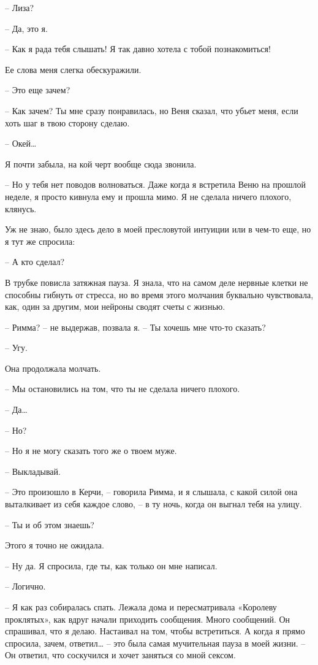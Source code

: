 \documentclass[
]{book}
\begin{document}
-- Лиза?

-- Да, это я.

-- Как я рада тебя слышать! Я так давно хотела с тобой познакомиться!

Ее слова меня слегка обескуражили.

-- Это еще зачем?

-- Как зачем? Ты мне сразу понравилась, но Веня сказал, что убьет меня, если хоть шаг в твою сторону сделаю.

-- Окей\ldots{}

Я почти забыла, на кой черт вообще сюда звонила.

-- Но у тебя нет поводов волноваться. Даже когда я встретила Веню на прошлой неделе, я просто кивнула ему и прошла мимо. Я не сделала ничего плохого, клянусь.

Уж не знаю, было здесь дело в моей пресловутой интуиции или в чем-то еще, но я тут же спросила:

-- А кто сделал?

В трубке повисла затяжная пауза. Я знала, что на самом деле нервные клетки не способны гибнуть от стресса, но во время этого молчания буквально чувствовала, как, один за другим, мои нейроны сводят счеты с жизнью.

-- Римма? -- не выдержав, позвала я. -- Ты хочешь мне что-то сказать?

-- Угу.

Она продолжала молчать.

-- Мы остановились на том, что ты не сделала ничего плохого.

-- Да\ldots{}

-- Но?

-- Но я не могу сказать того же о твоем муже.

-- Выкладывай.

-- Это произошло в Керчи, -- говорила Римма, и я слышала, с какой силой она выталкивает из себя каждое слово, -- в ту ночь, когда он выгнал тебя на улицу.

-- Ты и об этом знаешь?

Этого я точно не ожидала.

-- Ну да. Я спросила, где ты, как только он мне написал.

-- Логично.

-- Я как раз собиралась спать. Лежала дома и пересматривала «Королеву проклятых», как вдруг начали приходить сообщения. Много сообщений. Он спрашивал, что я делаю. Настаивал на том, чтобы встретиться. А когда я прямо спросила, зачем, ответил\ldots{} -- это была самая мучительная пауза в моей жизни. -- Он ответил, что соскучился и хочет заняться со мной сексом.
\end{document}
